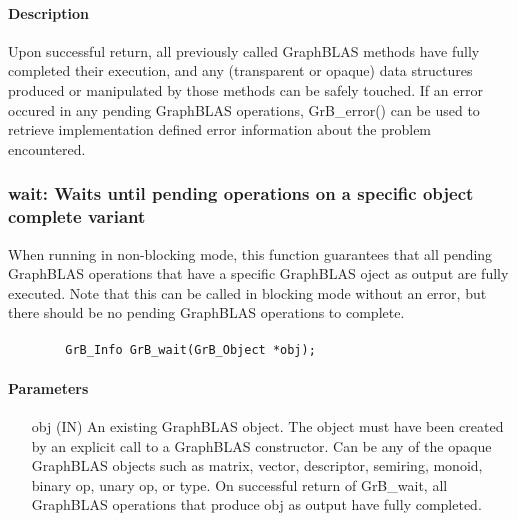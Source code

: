 \paragraph{Description}

Upon successful return, all previously called GraphBLAS methods have fully
completed their execution, and any (transparent or opaque) data structures
produced or manipulated by those methods can be safely touched.  If an
error occured in any pending GraphBLAS operations, {\sf GrB\_error()}
can be used to retrieve implementation defined error information about
the problem encountered.

\subsubsection{{\sf wait}: Waits until pending operations on a specific object complete variant}
\label{Sec:GrB_waitOne}

When running in non-blocking mode, this function guarantees that all
pending GraphBLAS operations that have a specific GraphBLAS oject as
output are fully executed.  Note that this can be called in blocking mode
without an error, but there should be no pending GraphBLAS operations
to complete.

\paragraph{\syntax}

\begin{verbatim}
        GrB_Info GrB_wait(GrB_Object *obj);
\end{verbatim}

\paragraph{Parameters}

\begin{itemize}[leftmargin=1.1in]
        \item[{\sf obj}] ({\sf IN}) An existing GraphBLAS object.
        The object must have been created by an explicit call to a
        GraphBLAS constructor.  Can be any of the opaque GraphBLAS
        objects such as matrix, vector, descriptor, semiring, monoid,
        binary op, unary op, or type. On successful return of {\sf
        GrB\_wait}, all GraphBLAS operations that produce {\sf obj}
        as output have fully completed.
\end{itemize}

